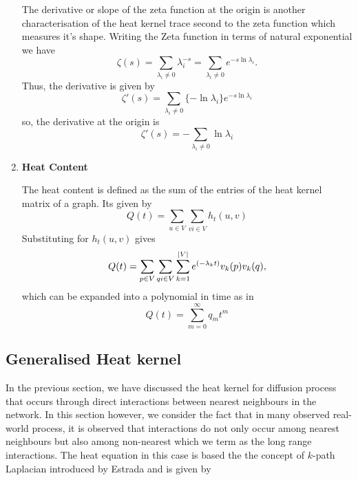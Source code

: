 \documentclass[10pt,a4paper]{article}
\begin{document}
\begin{enumerate}[1]
        	The derivative or slope of the zeta function at the origin is another characterisation of the heat kernel trace second to the zeta function which measures it's shape. Writing the Zeta function in terms of natural exponential we have
        	\begin{equation}
        	\zeta(s) = \sum_{\lambda_i \neq 0} \lambda_{i} ^{-s} = \sum_{\lambda_i \neq 0} e^{-s \ln \lambda_i}.
        	\end{equation}
        	Thus, the derivative is given by
        	\begin{equation}
        	\zeta'(s) = \sum_{\lambda_i \neq 0} \{-\ln \lambda_i\}
        	e^{-s \ln \lambda_i}
        	\end{equation}
        	so, the derivative at the origin is 
        	\begin{equation}
	        \zeta'(s) = -\sum_{\lambda_i \neq 0}\ln \lambda_i
        	\end{equation}
        	\item \textbf{Heat Content}
        	
        	The heat content is defined as the sum of the entries of the heat kernel matrix of a graph. Its given by
        	\begin{equation}
        	Q(t) = \sum_{u \in V} \sum_{v i\in V} h_{t}(u,v)
        	\end{equation}
        	Substituting for $h_t(u,v)$ gives
        	\begin{equation}
        	Q(t) = \sum_{p \in V} \sum_{q i\in V} \sum_{k=1}^{\arrowvert V\arrowvert} e^{(-\lambda_{k} t)} v_{k}(p) v_{k}(q),
        	\end{equation}
        	which can be expanded into a polynomial in time as in \citep{mcdonald2002diffusions}
        	\begin{equation}
        	Q(t) = \sum_{m=0}^{\infty} q_m t^m
        	\end{equation}
        \end{enumerate}
    
        \subsection{Generalised Heat kernel}
        In the previous section, we have discussed the heat kernel for diffusion process that occurs through direct interactions between nearest neighbours in the network. In this section however, we consider the fact that in many observed real-world process, it is observed that interactions do not only occur among nearest neighbours but also among non-nearest which we term as the long range interactions. The heat equation in this case is based the the concept of $k$-path Laplacian introduced by Estrada \citep{estrada2012path} and is given by
        
\end{document}
